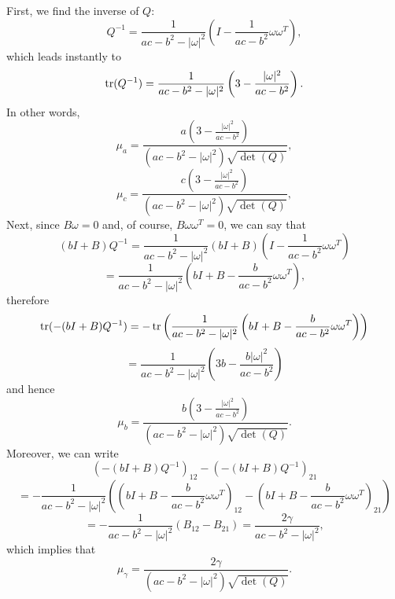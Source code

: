 First, we find the inverse of $Q$:
\[
    Q^{-1}=\frac{1}{ac-b^2-|\omega|^2}\left( I -\frac{1}{ac-b^2}\omega \omega^T \right),
\]
which leads instantly to
\[
    \operatorname{tr}(Q^{-1}) = \frac{1}{ac-b^2-|\omega|^2}\left(3-\frac{|\omega|^2}{ac-b^2}\right).
\]
In other words,
\[
    \mu_a =   \frac{ a\left(3-\frac{|\omega|^2}{ac-b^2}\right)}
    {(ac-b^2-|\omega|^2)\sqrt {\det(Q)}},
\]
\[
    \mu_c =  \frac{ c\left(3-\frac{|\omega|^2}{ac-b^2}\right)}
    {(ac-b^2-|\omega|^2)\sqrt {\det(Q)}},
\]
Next, since $B \omega =0$ and, of course, $B \omega \omega^T=0$, we can say that
\[
    (bI+B)Q^{-1} 
    =\frac{1}{ac-b^2-|\omega|^2} (bI+B) \left( I -\frac{1}{ac-b^2}\omega \omega^T \right)
\]
\[
    =\frac{1}{ac-b^2-|\omega|^2} \left( bI+B - \frac{b}{ac-b^2}\omega \omega^T \right),
\]
therefore
\[
    \operatorname{tr} (-(bI+B)Q^{-1}) 
    = -\operatorname{tr} \left( \frac{1}{ac-b^2-|\omega|^2} \left( bI+B - \frac{b}{ac-b^2}\omega \omega^T \right)\right)
\]
\[ 
    = \frac{1}{ac-b^2-|\omega|^2} \left( 3b   - \frac{b|\omega|^2}{ac-b^2}  \right)
\]
and hence
\[
    \mu_b = \frac{ b\left(3-\frac{|\omega|^2}{ac-b^2}\right)}
    {(ac-b^2-|\omega|^2)\sqrt {\det(Q)}}.
\]
Moreover, we can write
\[
    (-(bI+B)Q^{-1})_{12} -(-(bI+B)Q^{-1})_{21} 
\]
\[
    = - \frac{1}{ac-b^2-|\omega|^2} \left(  \left(  bI+B - \frac{b}{ac-b^2}\omega \omega^T \right)_{12} -\left(  bI+B - \frac{b}{ac-b^2}\omega \omega^T \right)_{21}   \right)
\]
\[
    =- \frac{1}{ac-b^2-|\omega|^2} \left(  B _{12} -  B_{21}   \right)
    = \frac{2 \gamma}{ac-b^2-|\omega|^2},
\]
which implies that
\[
    \mu_{\gamma} =  \frac{2 \gamma}{(ac-b^2-|\omega|^2)\sqrt {\det(Q)}}.
\]

